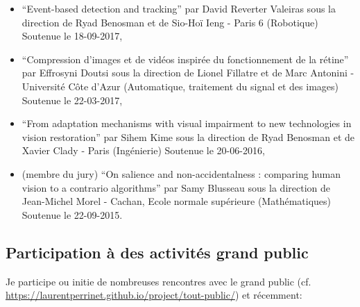 \documentclass[10pt,french,a4paper,oneside]{article}%
\begin{document}
\begin{itemize}
	\item ``Event-based detection and tracking'' par David Reverter Valeiras sous la direction de Ryad Benosman et de Sio-Hoï Ieng - Paris 6	(Robotique)	Soutenue le 18-09-2017,
	\item ``Compression d'images et de vidéos inspirée du fonctionnement de la rétine''	par Effrosyni Doutsi sous la direction de Lionel Fillatre et de Marc Antonini - Université Côte d'Azur	(Automatique, traitement du signal et des images) 	Soutenue le 22-03-2017,
	\item ``From adaptation mechanisms with visual impairment to new technologies in vision restoration'' par Sihem Kime sous la direction de Ryad Benosman et de Xavier Clady - Paris (Ingénierie) Soutenue le 20-06-2016,
	\item (membre du jury) ``On salience and non-accidentalness : comparing human vision to a contrario algorithms''  par Samy Blusseau sous la direction de Jean-Michel Morel - Cachan, Ecole normale supérieure	(Mathématiques) Soutenue le 22-09-2015.
\end{itemize} %
	

\subsection{Participation à des activités grand public} %

Je participe ou initie de nombreuses rencontres avec le grand public (cf. \url{https://laurentperrinet.github.io/project/tout-public/}) et récemment:
\end{document}
